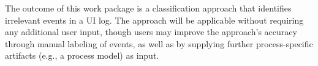 The outcome of this work package is a classification approach that identifies irrelevant events in a UI log. The approach will be applicable without requiring any additional user input, though users may improve the approach's accuracy through manual labeling of events, as well as by supplying further process-specific artifacts (e.g., a process model) as input.
%
%

